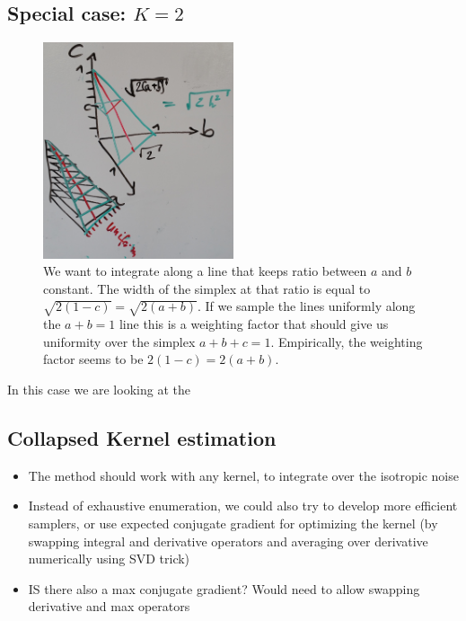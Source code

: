 \documentclass[twoside]{article}
\begin{document}
\subsection{Special case: $K=2$}

\begin{figure}[h!]
  \centering
      \includegraphics[width=0.5\textwidth]{dirichlet_quadrature_lmm.jpg}%
  \caption{We want to integrate along a line that keeps ratio between $a$ and $b$ constant. The width of the simplex at that ratio is equal to $\sqrt{2(1-c)} = \sqrt{2 (a+b)}$. If we sample the lines uniformly along the $a+b=1$ line this is a weighting factor that should give us uniformity over the simplex $a+b+c=1$. Empirically, the weighting factor seems to be ${2(1-c)} = {2 (a+b)}$.}
\end{figure}

In this case we are looking at the

\subsection{Collapsed Kernel estimation}

\begin{itemize}
\item The method should work with any kernel, to integrate over the isotropic noise
\item Instead of exhaustive enumeration, we could also try to develop more efficient samplers, or use expected conjugate gradient for optimizing the kernel (by swapping integral and derivative operators and averaging over derivative numerically using SVD trick)
\item IS there also a max conjugate gradient? Would need to allow swapping derivative and max operators
\end{itemize}
\end{document}
